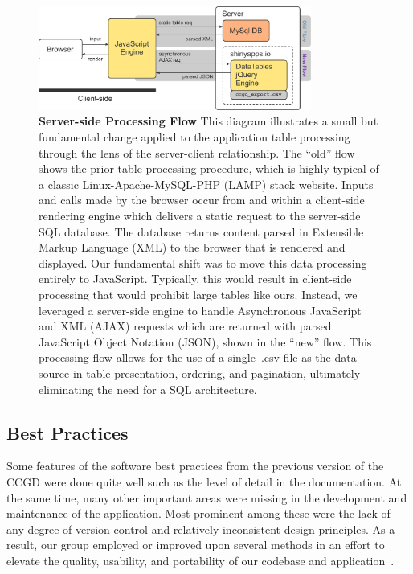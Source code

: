 \documentclass[10pt]{report}
\begin{document}
\begin{figure}[H]
    \center{}
    \includegraphics[width=0.8\textwidth]{fig/parse_flow.pdf}
    \caption[Server-side Processing Flow]{\textbf{Server-side Processing Flow} This diagram illustrates a small but fundamental change applied to the application table processing through the lens of the server-client relationship. The ``old'' flow shows the prior table processing procedure, which is highly typical of a classic Linux-Apache-MySQL-PHP (LAMP) stack website. Inputs and calls made by the browser occur from and within a client-side rendering engine which delivers a static request to the server-side SQL database. The database returns content parsed in Extensible Markup Language (XML) to the browser that is rendered and displayed. Our fundamental shift was to move this data processing entirely to JavaScript. Typically, this would result in client-side processing that would prohibit large tables like ours. Instead, we leveraged a server-side engine to handle Asynchronous JavaScript and XML (AJAX) requests which are returned with parsed JavaScript Object Notation (JSON), shown in the ``new'' flow. This processing flow allows for the use of a single~.csv file as the data source in table presentation, ordering, and pagination, ultimately eliminating the need for a SQL architecture.}\label{fig:parseFlow}
\end{figure}

\subsection{Best Practices}
Some features of the software best practices from the previous version of the CCGD were done quite well such as the level of detail in the documentation. At the same time, many other important areas were missing in the development and maintenance of the application. Most prominent among these were the lack of any degree of version control and relatively inconsistent design principles. As a result, our group employed or improved upon several methods in an effort to elevate the quality, usability, and portability of our codebase and application~\cite{finchamSoftwareDevelopmentPractices2011}.
\end{document}
